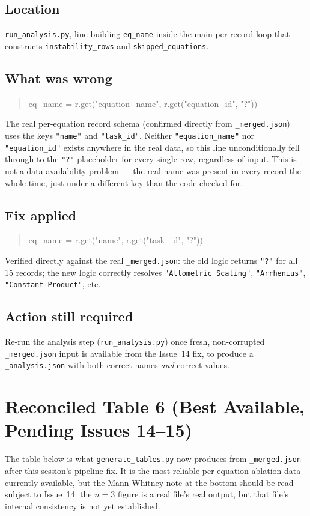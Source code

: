\documentclass[11pt]{article}
\begin{document}
\subsection*{Location}
\texttt{run\_analysis.py}, line building \texttt{eq\_name} inside the main
per-record loop that constructs \texttt{instability\_rows} and
\texttt{skipped\_equations}.

\subsection*{What was wrong}
\begin{quote}
\ttfamily\small
eq\_name = r.get("equation\_name", r.get("equation\_id", "?"))
\end{quote}
The real per-equation record schema (confirmed directly from
\texttt{\_merged.json}) uses the keys \texttt{"name"} and \texttt{"task\_id"}.
Neither \texttt{"equation\_name"} nor \texttt{"equation\_id"} exists anywhere
in the real data, so this line unconditionally fell through to the
\texttt{"?"} placeholder for every single row, regardless of input. This is
not a data-availability problem --- the real name was present in every
record the whole time, just under a different key than the code checked
for.

\subsection*{Fix applied}
\begin{quote}
\ttfamily\small
eq\_name = r.get("name", r.get("task\_id", "?"))
\end{quote}
Verified directly against the real \texttt{\_merged.json}: the old logic
returns \texttt{"?"} for all 15 records; the new logic correctly resolves
\texttt{"Allometric Scaling"}, \texttt{"Arrhenius"}, \texttt{"Constant
Product"}, etc.

\subsection*{Action still required}
Re-run the analysis step (\texttt{run\_analysis.py}) once fresh,
non-corrupted \texttt{\_merged.json} input is available from the Issue~14
fix, to produce a \texttt{\_analysis.json} with both correct names
\emph{and} correct values.

\section*{Reconciled Table 6 (Best Available, Pending Issues 14--15)}
The table below is what \texttt{generate\_tables.py} now produces from
\texttt{\_merged.json} after this session's pipeline fix. It is the most
reliable per-equation ablation data currently available, but the
Mann-Whitney note at the bottom should be read subject to Issue~14: the
$n=3$ figure is a real file's real output, but that file's internal
consistency is not yet established.
\end{document}

